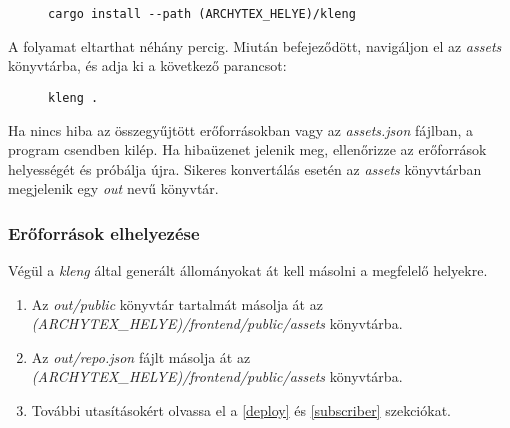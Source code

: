 \begin{figure}[h]
\centering
\begin{minipage}{.7\textwidth}
\begin{lstlisting}
cargo install --path (ARCHYTEX_HELYE)/kleng
\end{lstlisting}
\end{minipage}
\end{figure}

A folyamat eltarthat néhány percig. Miután befejeződött, navigáljon el az \emph{assets} könyvtárba,
és adja ki a következő parancsot:

\begin{figure}[h]
\centering
\begin{minipage}{.7\textwidth}
\begin{lstlisting}
kleng .
\end{lstlisting}
\end{minipage}
\end{figure}

Ha nincs hiba az összegyűjtött erőforrásokban vagy az \emph{assets.json} fájlban, a program
csendben kilép. Ha hibaüzenet jelenik meg, ellenőrizze az erőforrások helyességét és próbálja
újra. Sikeres konvertálás esetén az \emph{assets} könyvtárban megjelenik egy \emph{out}
nevű könyvtár.

\subsubsection{Erőforrások elhelyezése}

Végül a \emph{kleng} által generált állományokat át kell másolni a megfelelő helyekre.

\begin{enumerate}
    \item Az \emph{out/public} könyvtár tartalmát másolja át az \\
    \emph{(ARCHYTEX\_HELYE)/frontend/public/assets} könyvtárba.

    \item Az \emph{out/repo.json} fájlt másolja át az \\
    \emph{(ARCHYTEX\_HELYE)/frontend/public/assets} könyvtárba.

    \item További utasításokért olvassa el a \ref{deploy} és \ref{subscriber} szekciókat.

\end{enumerate}